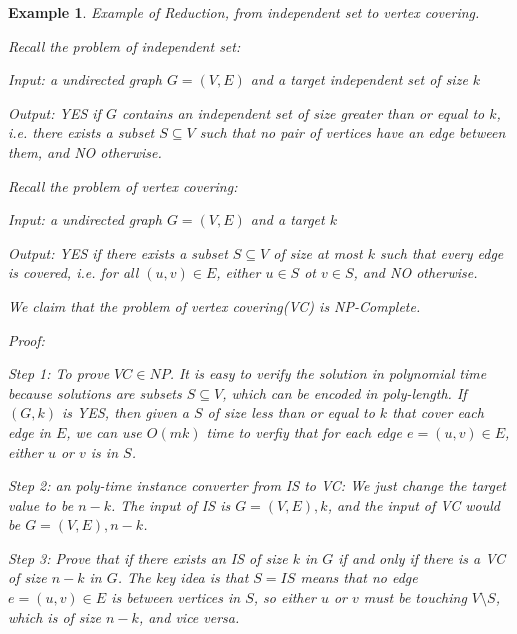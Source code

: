 \documentclass[twoside]{article}
\newtheorem{protoexample}[prototheorem]{Example}
\newenvironment{example}
{\colorlet{shadecolor}{red!15}\begin{shaded}\begin{protoexample}\normalfont}
		{\end{protoexample}\end{shaded}}
\begin{document}
\begin{example}
	Example of Reduction, from independent set to vertex covering. 
		
	Recall the problem of independent set: 
		
	Input: a undirected graph $G = (V, E)$ and a target independent set of size $k$
		
	Output: YES if $G$ contains an independent set of size greater than or equal to $k$, i.e. there exists a subset $S \subseteq V$ such that no pair of vertices have an edge between them, and NO otherwise. 
		
	Recall the problem of vertex covering: 
		
	Input: a undirected graph $G = (V, E)$ and a target $k$
		
	Output: YES if there exists a subset $S \subseteq V$ of size at most $k$ such that every edge is covered, i.e. for all $(u, v) \in E$, either $u \in S$ ot $v \in S$, and NO otherwise. 
		
	We claim that the problem of vertex covering(VC) is NP-Complete. 
		
	Proof: 
		 
	Step 1: To prove $VC \in NP$. It is easy to verify the solution in polynomial time because solutions are subsets $S \subseteq V$, which can be encoded in poly-length. If $(G, k)$ is YES, then given a $S$ of size less than or equal to $k$ that cover each edge in $E$, we can use $O(mk)$ time to verfiy that for each edge $e = (u, v) \in E$, either $u$ or $v$ is in $S$. 
		 
	Step 2: an poly-time instance converter from IS to VC: We just change the target value to be $n-k$. The input of IS is $G=(V, E), k$, and the input of VC would be $G=(V, E), n-k$. 
		 
	Step 3: Prove that if there exists an IS of size $k$ in $G$ if and only if there is a VC of size $n-k$ in $G$. The key idea is that $S = IS$ means that no edge $e = (u, v) \in E$ is between vertices in $S$, so either $u$ or $v$ must be touching $V \setminus S$, which is of size $n-k$, and vice versa.  
\end{example}
\end{document}
